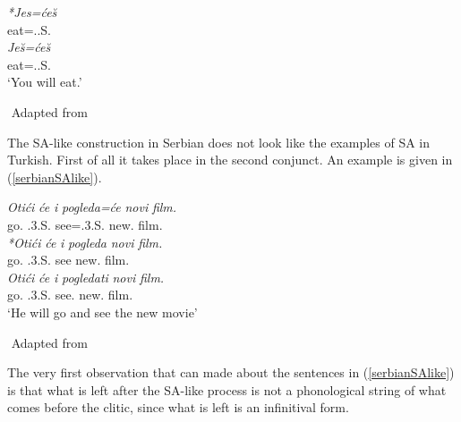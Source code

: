 \begin{exe}
    \ex \label{serbiance2}
    \begin{xlist}
        \ex 
        \gll 
        \textit{*Jes=\'{c}e\u{s}} \\ eat={\Aux}.{\Second}.S.{\Fut} \\
    
        \ex
        \gll 
        \textit{Je\u{s}=\'{c}e\u{s}} \\ eat={\Aux}.{\Second}.S.{\Fut} \\
        \glt `You will eat.'
    \end{xlist}
    ${}$ \hfill Adapted from \cite{despic2017suspended}
\end{exe}

The SA-like construction in Serbian does not look like the examples of SA in Turkish. First of all it takes place in the second conjunct. An example is given in (\ref{serbianSAlike}).

\begin{exe}
    \ex \label{serbianSAlike}
    \begin{xlist}
        \ex 
        \gll 
        \textit{Oti\'{c}i} \textit{\'{c}e} \textit{i} \textit{pogleda=\'{c}e} \textit{novi} \textit{film.} \\ go.{\Inf} {\Aux}.3.S.{\Fut} {\And} see={\Aux}.3.S.{\Fut} new.{\Acc} film.{\Acc} \\
        
        \ex 
        \gll 
        \textit{*Oti\'{c}i} \textit{\'{c}e} \textit{i} \textit{pogleda} \textit{novi} \textit{film.} \\ go.{\Inf} {\Aux}.3.S.{\Fut} {\And} see new.{\Acc} film.{\Acc} \\
        
        \ex 
        \gll 
        \textit{Oti\'{c}i} \textit{\'{c}e} \textit{i} \textit{pogledati} \textit{novi} \textit{film.} \\ go.{\Inf} {\Aux}.3.S.{\Fut} {\And} see.{\Inf} new.{\Acc} film.{\Acc} \\
        \glt `He will go and see the new movie'
    \end{xlist}
    ${}$ \hfill Adapted from \cite{despic2017suspended}
\end{exe}

The very first observation that can made about the sentences in (\ref{serbianSAlike}) is that what is left after the SA-like process is not a phonological string of what comes before the clitic, since what is left is an infinitival form.


